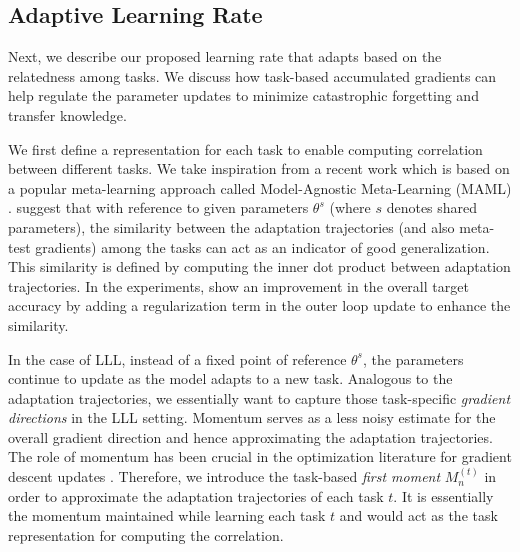 \documentclass{article} \usepackage{collas2022_conference,times}
\begin{document}
\subsection{Adaptive Learning Rate}\label{alpha_sec}

    Next, we describe our proposed learning rate that adapts based on the relatedness among tasks. We discuss how task-based accumulated gradients can help regulate the parameter updates to minimize catastrophic forgetting and transfer knowledge.

We first define a representation for each task to enable computing correlation between different tasks. We take inspiration from a recent work \citep{guiroy2019towards} which is based on a popular meta-learning approach called Model-Agnostic Meta-Learning (MAML) \citep{finn2017model}. \citet{guiroy2019towards} suggest that with reference to given parameters $\theta^s$ (where $s$ denotes shared parameters), the similarity between the adaptation trajectories (and also meta-test gradients) among the tasks can act as an indicator of good generalization. This similarity is defined by computing the inner dot product between adaptation trajectories. In the experiments, \citet{guiroy2019towards} show an improvement in the overall target accuracy by adding a regularization term in the outer loop update to enhance the similarity.
    
    In the case of LLL, instead of a fixed point of reference $\theta^s$, the parameters continue to update as the model adapts to a new task. Analogous to the adaptation trajectories, we essentially want to capture those task-specific \textit{gradient directions} in the LLL setting. Momentum serves as a less noisy estimate for the overall gradient direction and hence approximating the adaptation trajectories. The role of momentum has been crucial in the optimization literature for gradient descent updates \citep{ruder2016overview,li2017convergence}. Therefore, we introduce the task-based \textit{first moment} $M^{(t)}_n$ in order to approximate the adaptation trajectories of each task $t$. It is essentially the momentum maintained while learning each task $t$ and would act as the task representation for computing the correlation. 
\end{document}
